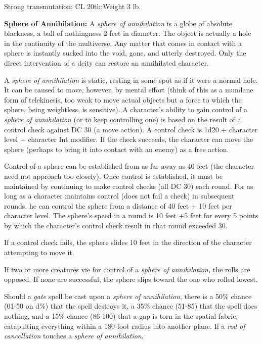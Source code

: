 \documentclass{article}
\begin{document}
Strong transmutation; CL 20th;Weight 3 lb.

\vspace{12pt}
\textbf{Sphere of Annihilation:} A \textit{sphere of annihilation }is a globe of 
absolute blackness, a ball of nothingness 2 feet in diameter. The object is actually 
a hole in the continuity of the multiverse. Any matter that comes in contact with 
a sphere is instantly sucked into the void, gone, and utterly destroyed. Only the 
direct intervention of a deity can restore an annihilated character.

A \textit{sphere of annihilation }is static, resting in some spot as if it were 
a normal hole. It can be caused to move, however, by mental effort (think of this 
as a mundane form of telekinesis, too weak to move actual objects but a force to 
which the sphere, being weightless, is sensitive). A character's ability to gain 
control of a \textit{sphere of annihilation }(or to keep controlling one) is based 
on the result of a control check against DC 30 (a move action). A control check 
is 1d20 + character level + character Int modifier. If the check succeeds, the 
character can move the sphere (perhaps to bring it into contact with an enemy) 
as a free action.

Control of a sphere can be established from as far away as 40 feet (the character 
need not approach too closely). Once control is established, it must be maintained 
by continuing to make control checks (all DC 30) each round. For as long as a character 
maintains control (does not fail a check) in subsequent rounds, he can control 
the sphere from a distance of 40 feet + 10 feet per character level. The sphere's 
speed in a round is 10 feet +5 feet for every 5 points by which the character's 
control check result in that round exceeded 30.

If a control check fails, the sphere slides 10 feet in the direction of the character 
attempting to move it.

If two or more creatures vie for control of a \textit{sphere of annihilation, }the 
rolls are opposed. If none are successful, the sphere slips toward the one who 
rolled lowest.

Should a \textit{gate }spell be cast upon a \textit{sphere of annihilation}, there 
is a 50\% chance (01-50 on d\%) that the spell destroys it, a 35\% chance (51-85) 
that the spell does nothing, and a 15\% chance (86-100) that a gap is torn in the 
spatial fabric, catapulting everything within a 180-foot radius into another plane. 
If a \textit{rod of cancellation }touches a \textit{sphere of annihilation},
\end{document}
